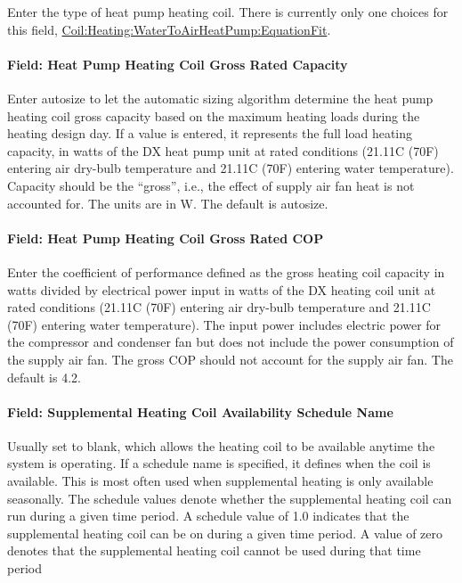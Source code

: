 Enter the type of heat pump heating coil. There is currently only one choices for this field, \hyperref[coilheatingwatertoairheatpumpequationfit]{Coil:Heating:WaterToAirHeatPump:EquationFit}.

\paragraph{Field: Heat Pump Heating Coil Gross Rated Capacity}\label{field-heat-pump-heating-coil-gross-rated-capacity-1}

Enter autosize to let the automatic sizing algorithm determine the heat pump heating coil gross capacity based on the maximum heating loads during the heating design day. If a value is entered, it represents the full load heating capacity, in watts of the DX heat pump unit at rated conditions (21.11C (70F) entering air dry-bulb temperature and 21.11C (70F) entering water temperature). Capacity should be the ``gross'', i.e., the effect of supply air fan heat is not accounted for. The units are in W. The default is autosize.

\paragraph{Field: Heat Pump Heating Coil Gross Rated COP}\label{field-heat-pump-heating-coil-gross-rated-cop-1}

Enter the coefficient of performance defined as the gross heating coil capacity in watts divided by electrical power input in watts of the DX heating coil unit at rated conditions (21.11C (70F) entering air dry-bulb temperature and 21.11C (70F) entering water temperature). The input power includes electric power for the compressor and condenser fan but does not include the power consumption of the supply air fan. The gross COP should not account for the supply air fan. The default is 4.2.

\paragraph{Field: Supplemental Heating Coil Availability Schedule Name}\label{field-supplemental-heating-coil-availability-schedule-name-1}

Usually set to blank, which allows the heating coil to be available anytime the system is operating. If a schedule name is specified, it defines when the coil is available. This is most often used when supplemental heating is only available seasonally. The schedule values denote whether the supplemental heating coil can run during a given time period. A schedule value of 1.0 indicates that the supplemental heating coil can be on during a given time period. A value of zero denotes that the supplemental heating coil cannot be used during that time period

